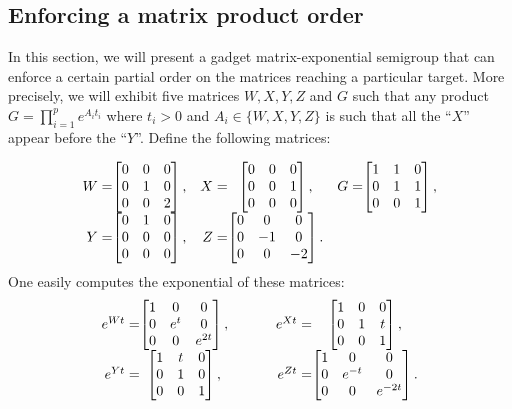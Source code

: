 \subsection{Enforcing a matrix product order}

In this section, we will present a gadget matrix-exponential semigroup that can
enforce a certain partial order on the matrices reaching a particular target.
More precisely, we will exhibit five matrices $W,X,Y,Z$ and $G$ such that any
product $G=\prod_{i=1}^pe^{A_it_i}$
where $t_i>0$ and $A_i\in\{W,X,Y,Z\}$ is such that all the ``$X$'' appear before
the ``$Y$''. Define the following matrices:

\[
\begin{array}{r@{}c@{}cr@{}c@{}cr@{}c}
W=&\begin{bmatrix}0&0&0\\0&1&0\\0&0&2\end{bmatrix},&&
X=&\begin{bmatrix}0&0&0\\0&0&1\\0&0&0\end{bmatrix},&&
G=&\begin{bmatrix}1&1&0\\0&1&1\\0&0&1\end{bmatrix},\\
Y=&\begin{bmatrix}0&1&0\\0&0&0\\0&0&0\end{bmatrix},&&
Z=&\begin{bmatrix}0&0&0\\0&-1&0\\0&0&-2\end{bmatrix}.&&&
\end{array}
\]
One easily computes the exponential of these matrices:
\[
\begin{array}{r@{}cp{.5cm}r@{}c}
e^{Wt}=&\begin{bmatrix}1&0&0\\0&e^t&0\\0&0&e^{2t}\end{bmatrix},&&
e^{Xt}=&\begin{bmatrix}1&0&0\\0&1&t\\0&0&1\end{bmatrix},\\
e^{Yt}=&\begin{bmatrix}1&t&0\\0&1&0\\0&0&1\end{bmatrix},&&
e^{Zt}=&\begin{bmatrix}1&0&0\\0&e^{-t}&0\\0&0&e^{-2t}\end{bmatrix}.
\end{array}
\]

